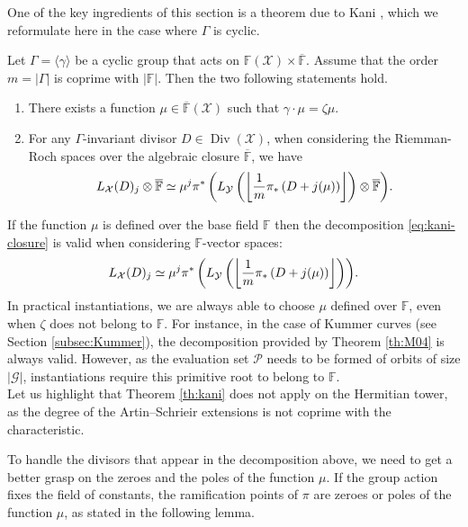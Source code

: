 \documentclass[10pt,a4paper]{article}
\newcommand\F{\mathbb{F}}
\newcommand\floor[1]{\left\lfloor #1 \right\rfloor}
\renewcommand{\bar}{\overline}
\DeclareMathOperator{\Div}{Div}
\let\div\relax\DeclareMathOperator{\div}{div}
\newcommand{\size}[1]{\left|#1\right|}
\newcommand\calY{\mathcal{Y}}
\newcommand\calX{\mathcal{X}}
\newcommand\calP{\mathcal{P}}
\newcommand\calG{\mathcal{G}}
\theoremstyle{plain}
\theoremstyle{plain}
\theoremstyle{definition}
\theoremstyle{remark}
\theoremstyle{plain}
\begin{document}
One of the key ingredients of this section is a theorem due to Kani \cite{Kani}, which we reformulate here in the case where $\Gamma$ is cyclic.

\begin{theorem}\label{th:kani}
	Let $\Gamma=\langle \gamma \rangle$ be a cyclic group that acts on $\F(\calX) \times \overline{\F}$. Assume that the order $m = \size{\Gamma}$ is coprime with $\size{\F}$. Then the two following statements hold.
	\begin{enumerate}
		\item There exists a function $\mu \in \bar{\F}(\calX)$ such that $\gamma \cdot \mu = \zeta \mu$.
		\item For any $\Gamma$-invariant divisor $D \in \Div(\calX)$, when considering the Riemman-Roch spaces over the algebraic closure $\bar{\F}$, we have
		\begin{equation} \label{eq:kani-closure}
			{L_\calX(D)_j\otimes \bar{\F} \simeq \mu^j \pi^* \left(L_\calY\left(\floor{\frac{1}{m}\pi_*\left(D+j\div(\mu)\right)}\right)\otimes \bar{\F}\right)}.
		\end{equation}
	\end{enumerate}
	
\end{theorem}

\begin{remark}
	If the function $\mu$ is defined over the base field $\F$ then the decomposition \eqref{eq:kani-closure} is valid when considering $\F$-vector spaces:
	\[   {L_\calX(D)_j \simeq \mu^j \pi^* \left(L_\calY\left(\floor{\frac{1}{m}\pi_*\left(D+j\div(\mu)\right)}\right)\right)}.\] 
	In practical instantiations, we are always able to choose $\mu$ defined over $\F$, even when $\zeta$ does not belong to $\F$. For instance, in the case of Kummer curves (see Section \ref{subsec:Kummer}), the decomposition provided by Theorem \ref{th:M04} is always valid. However, as the evaluation set $\calP$ needs to be formed of orbits of size $\size \calG$, instantiations require this primitive root to belong to $\F$.\\
	Let us highlight that Theorem \ref{th:kani} does not apply on the Hermitian tower, as the degree of the Artin--Schrieir extensions is not coprime with the characteristic.
\end{remark}

To handle the divisors that appear in the decomposition above, we need to get a better grasp on the zeroes and the poles of the function $\mu$. If the group action fixes the field of constants, the ramification points of $\pi$ are zeroes or poles of the function $\mu$, as stated in the following lemma.
\end{document}
